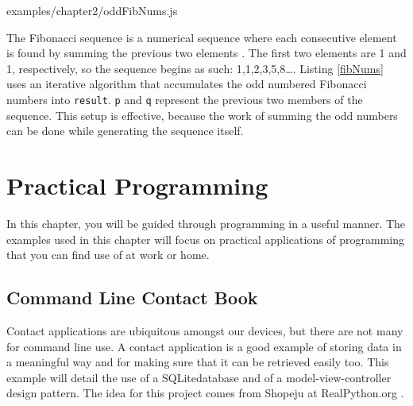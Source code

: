 \documentclass[12pt, oneside, a4paper]{book}
\begin{document}
         
         {examples/chapter2/oddFibNums.js}

         The Fibonacci sequence is a numerical sequence where each consecutive element is found by summing the previous two elements \autocite{parshallFibonacciSequence}.
         The first two elements are 1 and 1, respectively, so the sequence begins as such: 1,1,2,3,5,8\ldots.
         Listing \ref{fibNums} uses an iterative algorithm that accumulates the odd numbered Fibonacci numbers into \lstinline!result!.
         \lstinline!p! and \lstinline!q! represent the previous two members of the sequence.
         This setup is effective, because the work of summing the odd numbers can be done while generating the sequence itself.

   \chapter{Practical Programming}
   \label{chap:practical}
      In this chapter, you will be guided through programming in a useful manner.
      The examples used in this chapter will focus on practical applications of programming that you can find use of at work or home.

      \section{Command Line Contact Book}
      Contact applications are ubiquitous amongst our devices, but there are not many for command line use.
      A contact application is a good example of storing data in a meaningful way and for making sure that it can be retrieved easily too.
      This example will detail the use of a SQLite\footnotemark database and of a model-view-controller design pattern.
      The idea for this project comes from Shopeju at RealPython.org \autocite{shopeju13ProjectIdeas}.

\end{document}
